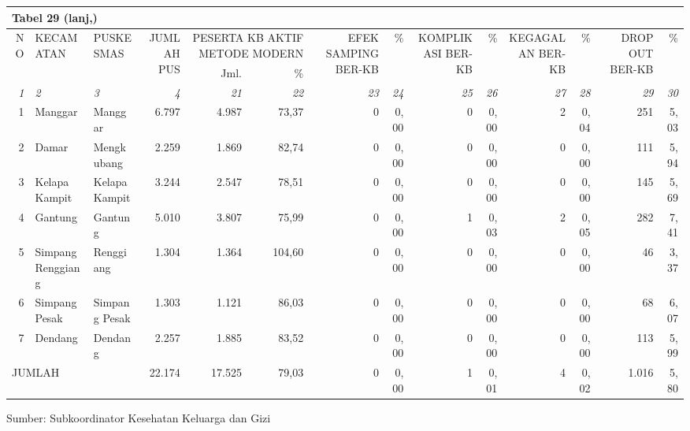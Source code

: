 \begin{small}
	\begin{tabular}{rllrrrrrrrrrrr}
		\multicolumn{14}{l}{Tabel 29 (lanj,)}\\
		\toprule
		\multirow{2}{*}{NO} & \multirow{2}{*}{KECAMATAN} & \multirow{2}{*}{PUSKESMAS} & \multirow{2}{*}{JUMLAH PUS} & \multicolumn{2}{X{10em}}{PESERTA KB AKTIF METODE MODERN} & \multirow{2}{6em}{\raggedleft EFEK SAMPING BER-KB} & \multirow{2}{*}{\%} & \multirow{2}{6em}{\raggedleft KOMPLIKASI BER-KB} & \multirow{2}{*}{\%} & \multirow{2}{6em}{\raggedleft KEGAGALAN BER-KB} & \multirow{2}{*}{\%} & \multirow{2}{6em}{\raggedleft DROP OUT BER-KB} & \multirow{2}{*}{\%}\\
		\cmidrule{5-6}
		& & & & Jml. & \% & & & & & & & & \\
		\midrule
		\emph{1} & \emph{2} & \emph{3} & \emph{4} & \emph{21} & \emph{22} & \emph{23} & \emph{24} & \emph{25} & \emph{26} & \emph{27} & \emph{28} & \emph{29} & \emph{30} \\
		\midrule
		1 & Manggar           & Manggar       &  6.797 &  4.987 &  73,37 & 0 & 0,00 & 0 & 0,00 & 2 & 0,04 &   251 & 5,03 \\
		2 & Damar             & Mengkubang    &  2.259 &  1.869 &  82,74 & 0 & 0,00 & 0 & 0,00 & 0 & 0,00 &   111 & 5,94 \\
		3 & Kelapa Kampit     & Kelapa Kampit &  3.244 &  2.547 &  78,51 & 0 & 0,00 & 0 & 0,00 & 0 & 0,00 &   145 & 5,69 \\
		4 & Gantung           & Gantung       &  5.010 &  3.807 &  75,99 & 0 & 0,00 & 1 & 0,03 & 2 & 0,05 &   282 & 7,41 \\
		5 & Simpang Renggiang & Renggiang     &  1.304 &  1.364 & 104,60 & 0 & 0,00 & 0 & 0,00 & 0 & 0,00 &    46 & 3,37 \\
		6 & Simpang Pesak     & Simpang Pesak &  1.303 &  1.121 &  86,03 & 0 & 0,00 & 0 & 0,00 & 0 & 0,00 &    68 & 6,07 \\
		7 & Dendang           & Dendang       &  2.257 &  1.885 &  83,52 & 0 & 0,00 & 0 & 0,00 & 0 & 0,00 &   113 & 5,99 \\
		\midrule                                
		\multicolumn{3}{l}{JUMLAH}            & 22.174 & 17.525 &  79,03 & 0 & 0,00 & 1 & 0,01 & 4 & 0,02 & 1.016 & 5,80 \\
		\bottomrule
	\end{tabular}%
\end{small} 

\vfill
Sumber: Subkoordinator Kesehatan Keluarga dan Gizi\par 
